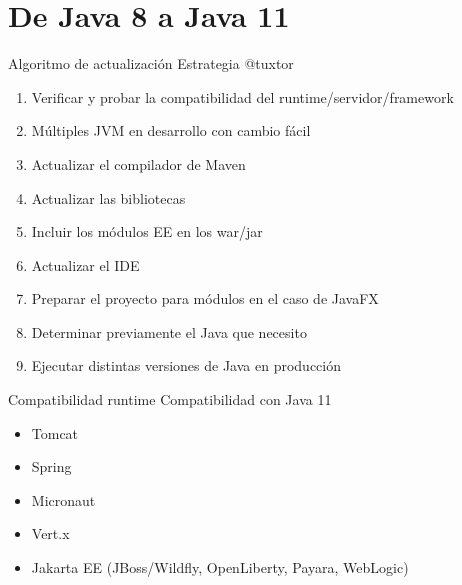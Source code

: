 \documentclass[aspectratio=169]{beamer}
\begin{document}
{
    \section{De Java 8 a Java 11}
}

\begin{frame}[fragile]{Algoritmo de actualización}
    Estrategia @tuxtor
    \begin{enumerate}
        \item Verificar y probar la compatibilidad del runtime/servidor/framework
        \item Múltiples JVM en desarrollo con cambio fácil
        \item Actualizar el compilador de Maven
        \item Actualizar las bibliotecas
        \item Incluir los módulos EE en los war/jar
        \item Actualizar el IDE
        \item Preparar el proyecto para módulos en el caso de JavaFX
        \item Determinar previamente el Java que necesito
        \item Ejecutar distintas versiones de Java en producción
    \end{enumerate}
\end{frame}

\begin{frame}[fragile]{Compatibilidad runtime}
    Compatibilidad con Java 11
    \begin{itemize}
        \item Tomcat
        \item Spring
        \item Micronaut
        \item Vert.x
        \item Jakarta EE (JBoss/Wildfly, OpenLiberty, Payara, WebLogic)
    \end{itemize}
\end{frame}
\end{document}
